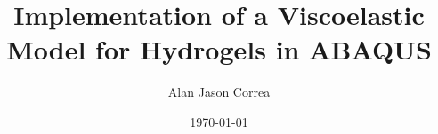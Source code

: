 \documentclass[12pt, a4paper]{report}
\begin{document}
\begin{titlepage}
    \title{Implementation of a Viscoelastic Model for Hydrogels in ABAQUS}
    \date{\today}
    \author{Alan Jason Correa}
\end{titlepage}

\maketitle
{}
\setcounter{page}{1}
%
\tableofcontents
%
\clearpage {}
\listoffigures
\clearpage
%
\setcounter{page}{1}






% 
\clearpage{} 
{\raggedright%
\printbibliography{}%
}
\clearpage{}

\appendix

\end{document}
